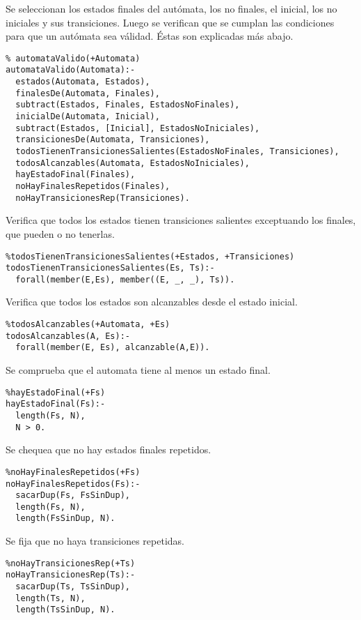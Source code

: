 \documentclass[10pt, a4paper,english,spanish,hidelinks]{article}
\begin{document}
Se seleccionan los estados finales del autómata, los no finales, el inicial, los no iniciales y
sus transiciones. Luego se verifican que se cumplan las condiciones para que un autómata sea
válidad. Éstas son explicadas más abajo.

\begin{verbatim}
% automataValido(+Automata)
automataValido(Automata):-
  estados(Automata, Estados),
  finalesDe(Automata, Finales),
  subtract(Estados, Finales, EstadosNoFinales),
  inicialDe(Automata, Inicial),
  subtract(Estados, [Inicial], EstadosNoIniciales),
  transicionesDe(Automata, Transiciones),
  todosTienenTransicionesSalientes(EstadosNoFinales, Transiciones),
  todosAlcanzables(Automata, EstadosNoIniciales),
  hayEstadoFinal(Finales),
  noHayFinalesRepetidos(Finales),
  noHayTransicionesRep(Transiciones).
\end{verbatim}
						
Verifica que todos los estados tienen transiciones salientes exceptuando los finales, que pueden
o no tenerlas.
\begin{verbatim}
%todosTienenTransicionesSalientes(+Estados, +Transiciones)
todosTienenTransicionesSalientes(Es, Ts):- 
  forall(member(E,Es), member((E, _, _), Ts)).
\end{verbatim}

Verifica que todos los estados son alcanzables desde el estado inicial.
\begin{verbatim}
%todosAlcanzables(+Automata, +Es)
todosAlcanzables(A, Es):- 
  forall(member(E, Es), alcanzable(A,E)). 
\end{verbatim}

Se comprueba que el automata tiene al menos un estado final.
\begin{verbatim}
%hayEstadoFinal(+Fs)
hayEstadoFinal(Fs):- 
  length(Fs, N), 
  N > 0.
\end{verbatim}

Se chequea que no hay estados finales repetidos.
\begin{verbatim}
%noHayFinalesRepetidos(+Fs)
noHayFinalesRepetidos(Fs):- 
  sacarDup(Fs, FsSinDup), 
  length(Fs, N), 
  length(FsSinDup, N).
\end{verbatim}

Se fija que no haya transiciones repetidas.
\begin{verbatim}
%noHayTransicionesRep(+Ts)
noHayTransicionesRep(Ts):- 
  sacarDup(Ts, TsSinDup), 
  length(Ts, N), 
  length(TsSinDup, N).
\end{verbatim}
\end{document}
